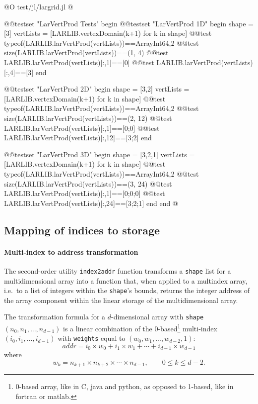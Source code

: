 @O test/jl/largrid.jl
@{
@@testset "LarVertProd Tests" begin
   @@testset "LarVertProd 1D" begin
      shape = [3]
      vertLists = [LARLIB.vertexDomain(k+1) for k in shape]
      @@test typeof(LARLIB.larVertProd(vertLists))==Array{Int64,2}
      @@test size(LARLIB.larVertProd(vertLists))==(1, 4)
      @@test LARLIB.larVertProd(vertLists)[:,1]==[0]
      @@test LARLIB.larVertProd(vertLists)[:,4]==[3]
   end

   @@testset "LarVertProd 2D" begin
      shape = [3,2]
      vertLists = [LARLIB.vertexDomain(k+1) for k in shape]
      @@test typeof(LARLIB.larVertProd(vertLists))==Array{Int64,2}
      @@test size(LARLIB.larVertProd(vertLists))==(2, 12)
      @@test LARLIB.larVertProd(vertLists)[:,1]==[0;0]
      @@test LARLIB.larVertProd(vertLists)[:,12]==[3;2]
   end

   @@testset "LarVertProd 3D" begin
      shape = [3,2,1]
      vertLists = [LARLIB.vertexDomain(k+1) for k in shape]
      @@test typeof(LARLIB.larVertProd(vertLists))==Array{Int64,2}
      @@test size(LARLIB.larVertProd(vertLists))==(3, 24)
      @@test LARLIB.larVertProd(vertLists)[:,1]==[0;0;0]
      @@test LARLIB.larVertProd(vertLists)[:,24]==[3;2;1]
   end
end
@}


\subsection{Mapping of indices to storage}

\paragraph{Multi-index to address transformation}
The second-order utility \texttt{index2addr} function transforms a \texttt{shape} list for a multidimensional array into a function that, when applied to a multindex array, i.e.~to a list of integers within the \texttt{shape}'s bounds, returns the integer address of the array component within the linear storage of the multidimensional array.

The transformation formula for a $d$-dimensional array with \texttt{shape} $(n_0,n_1,...,n_{d-1})$ is a linear combination of the 0-based\footnote{0-based array, like in C, java and python, as opposed to 1-based, like in fortran or matlab.} multi-index $(i_0,i_1,...,i_{d-1})$ with \texttt{weights} equal to $(w_0,w_1,...,w_{d-2},1)$:
\[
addr = i_0\times w_0 +i_1\times w_1 +\cdots +i_{d-1}\times w_{d-1}
\]
where 
\[
w_k = n_{k+1} \times n_{k+2} \times\cdots\times  n_{d-1}, \qquad 0\leq k\leq d-2.
\]

